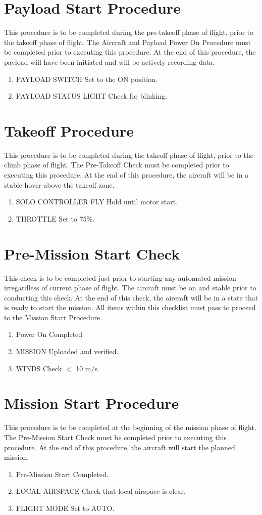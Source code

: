\documentclass{report}
\begin{document}
	\section{Payload Start Procedure}
		This procedure is to be completed during the pre-takeoff phase of flight, prior to the takeoff phase of flight.  The Aircraft and Payload Power On Procedure must be completed prior to executing this procedure.  At the end of this procedure, the payload will have been initiated and will be actively recording data.
		\begin{enumerate}
			\item PAYLOAD SWITCH \hrulefill Set to the ON position.
			\item PAYLOAD STATUS LIGHT \hrulefill Check for blinking.
		\end{enumerate}
	\section{Takeoff Procedure}
		This procedure is to be completed during the takeoff phase of flight, prior to the climb phase of flight.  The Pre-Takeoff Check must be completed prior to executing this procedure.  At the end of this procedure, the aircraft will be in a stable hover above the takeoff zone.
		\begin{enumerate}
			\item SOLO CONTROLLER FLY \hrulefill Hold until motor start.
			\item THROTTLE \hrulefill Set to 75\%.
		\end{enumerate}
	\section{Pre-Mission Start Check}
		This check is to be completed just prior to starting any automated mission irregardless of current phase of flight.  The aircraft must be on and stable prior to conducting this check.  At the end of this check, the aircraft will be in a state that is ready to start the mission.  All items within this checklist must pass to proceed to the Mission Start Procedure.
		\begin{enumerate}
			\item Power On \hrulefill Completed
			\item MISSION \hrulefill Uploaded and verified.
			\item WINDS \hrulefill Check $<$ 10 m/s.
		\end{enumerate}
	\section{Mission Start Procedure}
		This procedure is to be completed at the beginning of the mission phase of flight.  The Pre-Mission Start Check must be completed prior to executing this procedure.  At the end of this procedure, the aircraft will start the planned mission.
		\begin{enumerate}
			\item Pre-Mission Start \hrulefill Completed.
			\item LOCAL AIRSPACE \hrulefill Check that local airspace is clear.
			\item FLIGHT MODE \hrulefill Set to AUTO.
		\end{enumerate}
\end{document}
